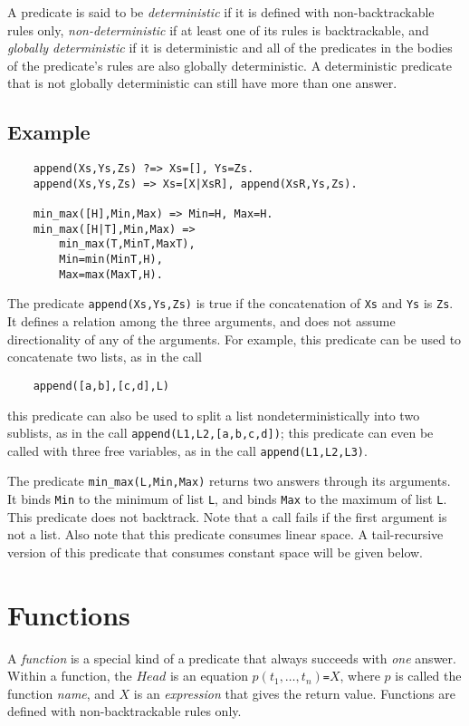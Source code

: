 A predicate is said to be \emph{deterministic} if it is defined with non-backtrackable rules only, \emph{non-deterministic} if at least one of its rules is backtrackable, and \emph{globally deterministic} if it is deterministic and all of the predicates in the bodies of the predicate's rules are also globally deterministic. A deterministic predicate that is not globally deterministic can still have more than one answer. 

\subsection*{Example}
\begin{verbatim}
    append(Xs,Ys,Zs) ?=> Xs=[], Ys=Zs.
    append(Xs,Ys,Zs) => Xs=[X|XsR], append(XsR,Ys,Zs).

    min_max([H],Min,Max) => Min=H, Max=H.
    min_max([H|T],Min,Max) => 
        min_max(T,MinT,MaxT), 
        Min=min(MinT,H),
        Max=max(MaxT,H).
\end{verbatim}
The predicate \texttt{append(Xs,Ys,Zs)} is true if the concatenation of \texttt{Xs} and \texttt{Ys} is \texttt{Zs}. It defines a relation among the three arguments, and does not assume directionality of any of the arguments. For example, this predicate can be used to concatenate two lists, as in the call 
\begin{verbatim}
    append([a,b],[c,d],L)
\end{verbatim}
this predicate can also be used to split a list nondeterministically into two sublists, as in the call \texttt{append(L1,L2,[a,b,c,d])}; this predicate can even be called with three free variables, as in the call \texttt{append(L1,L2,L3)}. 

The predicate \texttt{min\_max(L,Min,Max)} returns two answers through its arguments.  It binds \texttt{Min} to the minimum of list \texttt{L}, and binds \texttt{Max} to the maximum of list \texttt{L}. This predicate does not backtrack. Note that a call fails if the first argument is not a list. Also note that this predicate consumes linear space. A tail-recursive version of this predicate that consumes constant space will be given below.


\section{Functions}
A \emph{function} is a special kind of a predicate that always succeeds with \emph{one} answer. Within a function, the $Head$ is an equation $p(t_1,\ldots, t_n)$\verb+=+$X$, where $p$ is called the function \emph{name}, and $X$ is an \emph{expression} that gives the return value. Functions are defined with non-backtrackable rules only.  

